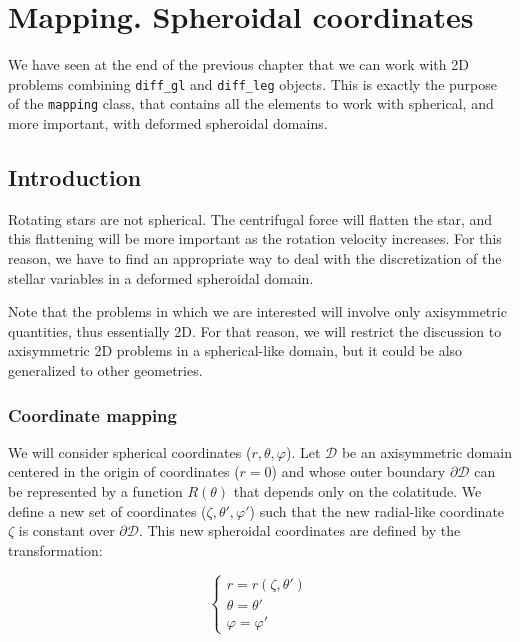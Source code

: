 \chapter{Mapping. Spheroidal coordinates}

We have seen at the end of the previous chapter that we can work with 2D problems combining {\tt diff\_gl} and
{\tt diff\_leg} objects. This is exactly the purpose of the {\tt mapping} class, that contains all the elements
to work with spherical, and more important, with deformed spheroidal domains. 

\section{Introduction}

Rotating stars are not spherical. The centrifugal force will flatten the star, and this flattening will
be more important as the rotation velocity increases. For this reason, we have to find an appropriate way
to deal with the discretization of the stellar variables in a deformed spheroidal domain.

Note that the problems in which we are interested will involve only axisymmetric quantities, thus essentially 
2D. For that reason, we will restrict the discussion to axisymmetric 2D problems in a spherical-like domain,
but it could be also generalized to other geometries.

\subsection{Coordinate mapping}

We will consider spherical coordinates ($r,\theta,\varphi$). Let $\mathcal{D}$ be an axisymmetric domain centered
in the origin of coordinates ($r=0$) and whose outer boundary $\partial\mathcal{D}$
can be represented by a function $R(\theta)$ that
depends only on the colatitude. We define a new set of coordinates ($\zeta,\theta',\varphi'$) such that 
the new radial-like coordinate $\zeta$ is constant over $\partial\mathcal{D}$. This new spheroidal
coordinates are defined by the transformation:

\begin{equation}
\left\{
\begin{array}{l}
r=r(\zeta,\theta')\\
\theta=\theta'\\
\varphi=\varphi'
\end{array}
\right.
\end{equation}

